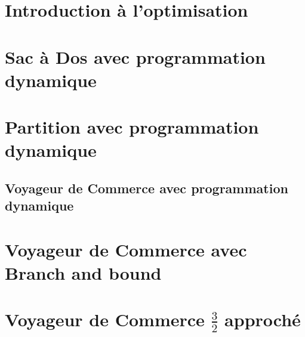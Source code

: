 \section{Introduction à l'optimisation}


\section{Sac à Dos avec programmation dynamique}


\section{Partition avec programmation dynamique}


\subsection{Voyageur de Commerce avec programmation dynamique}





\pagebreak
\section{Voyageur de Commerce avec Branch and bound}





\pagebreak
\section{Voyageur de Commerce $\frac{3}{2}$ approché}

